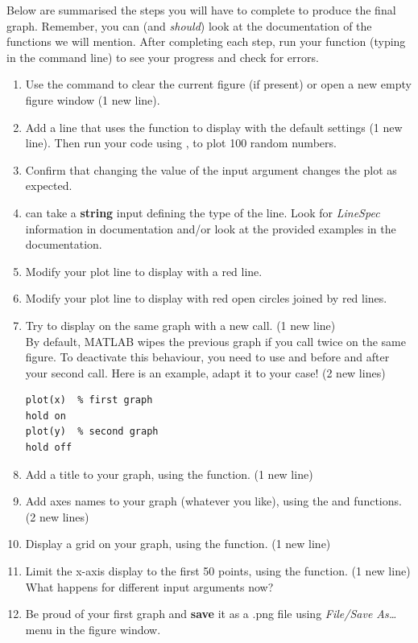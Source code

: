 \documentclass{article}
\begin{document}
Below are summarised the steps you will have to complete to produce the final graph.
Remember, you can (and \emph{should}) look at the documentation of the functions we will mention.
After completing each step, run your function (typing  in the command line) to see your progress and check for errors.
\begin{enumerate}
  \item Use the  command to clear the current figure (if present) or open a new empty figure window (1 new line).
  \item Add a line that uses the  function to display  with the default settings (1 new line). Then run your code using
  , to plot 100 random numbers.
  \item Confirm that changing the value of the input argument changes the plot as expected.
  \item {} can take a \textbf{string} input defining the type of the line.
    Look for \emph{LineSpec} information in  documentation and/or look at the provided examples in the documentation.
  \item Modify your plot line to display  with a red line.
  \item Modify your plot line to display  with red open circles joined by red lines.
  \item Try to display  on the same graph with a new  call. (1 new line)\\
    By default, MATLAB wipes the previous graph if you call  twice on the same figure.
    To deactivate this behaviour, you need to use  and  before and after
    your second  call.
    Here is an example, adapt it to your case! (2 new lines)
\begin{lstlisting}
plot(x)  % first graph
hold on
plot(y)  % second graph
hold off
\end{lstlisting}
  \item Add a title to your graph, using the  function. (1 new line)
  \item Add axes names to your graph (whatever you like), using the  and  functions. (2 new lines)
  \item Display a grid on your graph, using the  function. (1 new line)
  \item Limit the x-axis display to the first 50 points, using the  function. (1 new line) What happens for different
  input arguments now?
  \item Be proud of your first graph and \textbf{save} it as a .png file using \emph{File/Save As\dots} menu in the figure window.
\end{enumerate}
\end{document}
